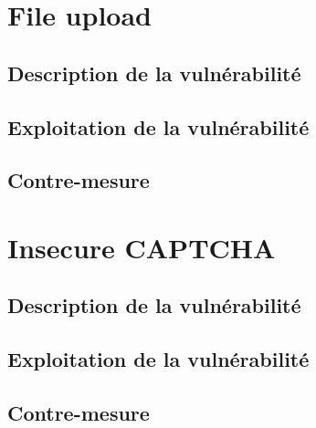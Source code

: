 \section{File upload}

\subsection{Description de la vulnérabilité}

\subsection{Exploitation de la vulnérabilité}

\subsection{Contre-mesure}

\section{Insecure CAPTCHA}

\subsection{Description de la vulnérabilité}

\subsection{Exploitation de la vulnérabilité}

\subsection{Contre-mesure}








